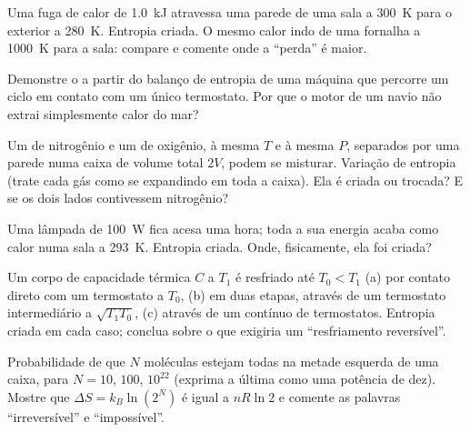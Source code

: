 \begin{exercise}[$\star\star$]\label{exo:b1:second-law-entropy:7}
Uma fuga de calor de \qty{1.0}{kJ} atravessa uma parede de uma sala a
\qty{300}{K} para o exterior a \qty{280}{K}. Entropia criada. O mesmo calor
indo de uma fornalha a \qty{1000}{K} para a sala: compare e comente onde a
``perda'' é maior.
\end{exercise}

\begin{exercise}[$\star\star$]\label{exo:b1:second-law-entropy:8}
Demonstre o  a partir do balanço de entropia de uma
máquina que percorre um ciclo em contato com um único termostato. Por que
o motor de um navio não extrai simplesmente calor do mar?
\end{exercise}

\begin{exercise}[$\star\star$]\label{exo:b1:second-law-entropy:9}
Um  de nitrogênio e um  de oxigênio, à mesma $T$ e à mesma $P$,
separados por uma parede numa caixa de volume total $2V$, podem se misturar. Variação
de entropia (trate cada gás como se expandindo em toda a caixa). Ela é
criada ou trocada? E se os dois lados contivessem nitrogênio?
\end{exercise}

\begin{exercise}[$\star\star\star$]\label{exo:b1:second-law-entropy:10}
Uma lâmpada de \qty{100}{W} fica acesa uma hora; toda a sua energia acaba
como calor numa sala a \qty{293}{K}. Entropia criada. Onde, fisicamente,
ela foi criada?
\end{exercise}

\begin{exercise}[$\star\star\star$]\label{exo:b1:second-law-entropy:11}
Um corpo de capacidade térmica $C$ a $T_1$ é resfriado até $T_0 < T_1$ (a)
por contato direto com um termostato a $T_0$, (b) em duas etapas, através
de um termostato intermediário a $\sqrt{T_1T_0}$, (c) através de um
contínuo de termostatos. Entropia criada em cada caso; conclua sobre o que
exigiria um ``resfriamento reversível''.
\end{exercise}

\begin{exercise}[$\star\star\star$]\label{exo:b1:second-law-entropy:12}
Probabilidade de que $N$ moléculas estejam todas na metade esquerda de uma
caixa, para $N = 10$, $100$, $10^{22}$ (exprima a última como uma potência de
dez). Mostre que $\Delta S = k_B\ln(2^N)$ é igual a $nR\ln2$ e comente as
palavras ``irreversível'' e ``impossível''.
\end{exercise}


